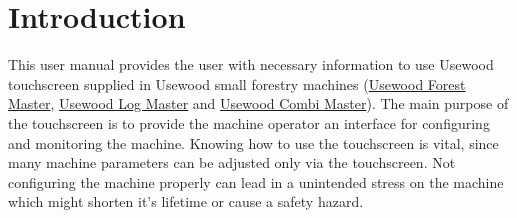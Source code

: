 \documentclass[12pt,a4paper,english]{uvmanual}
\begin{document}
\if@twoside
\clearpage
\fi

\setcounter{page}{0} %




%
%

\renewcommand\contentsname{Table of content}         %
\setcounter{tocdepth}{3}                      %
\tableofcontents                              %

\cleardoublepage

\newpage             %
\setcounter{page}{1} %
\renewcommand{\chaptername}{} %

\chapter{Introduction}

This user manual provides the user with necessary information to use Usewood touchscreen supplied in Usewood small forestry machines (\href{http://usewood.fi/index.php/en/small-harvesters/forest-master}{Usewood Forest Master}, \href{http://usewood.fi/index.php/en/small-harvesters/log-master-en}{Usewood Log Master} and \href{http://usewood.fi/index.php/en/small-harvesters/combi-master}{Usewood Combi Master}). The main purpose of the touchscreen is to provide the machine operator an interface for configuring and monitoring the machine. Knowing how to use the touchscreen is vital, since many machine parameters can be adjusted only via the touchscreen. Not configuring the machine properly can lead in a unintended stress on the machine which might shorten it's lifetime or cause a safety hazard.

\end{document}
